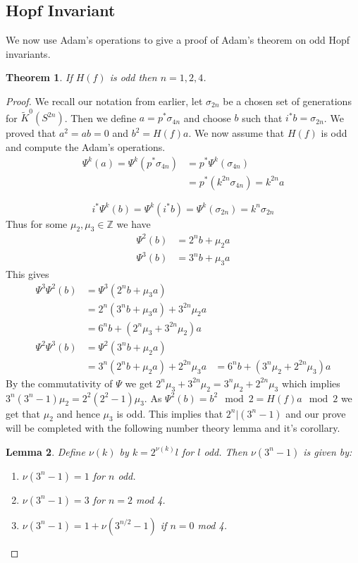 \documentclass[a4paper,10pt]{article}
\theoremstyle{plain}%
\newtheorem{thm}{Theorem}
\newtheorem{lem}[thm]{Lemma}
\theoremstyle{definition}
\theoremstyle{remark}
\newcommand{\ZZ}{\mathbb{Z}}
\newcommand{\KR}{\widetilde{K}}   %
\begin{document}
\subsection{Hopf Invariant}

We now use Adam's operations to give a proof of Adam's theorem on odd Hopf
invariants.

\begin{thm}
  If $H(f)$ is odd then $n=1,2,4$.
\end{thm}

\begin{proof}
  We recall our notation from earlier, let $\sigma_{2n}$ be a chosen set of generations for
  $\KR^0(S^{2n})$. Then we define $a=p^*\sigma_{4n}$ and choose $b$ such that
  $i^*b=\sigma_{2n}$. We proved that $a^2=a b=0$ and $b^2=H(f)a$. 
  We now assume  that $H(f)$ is odd and compute the Adam's operations.
  \begin{align*}
    \Psi^k(a)=\Psi^k(p^*\sigma_{4n})&=p^*\Psi^k(\sigma_{4n})\\
    &=p^*(k^{2n}\sigma_{4n})=k^{2n}a
  \end{align*}

$$ i^*\Psi^k(b)=\Psi^k(i^*b)=\Psi^k(\sigma_{2n})=k^n\sigma_{2n}$$
Thus for some $\mu_2,\mu_3\in\ZZ$ we have
\begin{align*}
  \Psi^2(b)&=2^nb+\mu_2a\\
  \Psi^3(b)&=3^nb+\mu_3a
\end{align*}
This gives
\begin{align*}
  \Psi^3\Psi^2(b)&=\Psi^3(2^nb+\mu_3a)\\
  &=2^n(3^nb+\mu_3a)+3^{2n}\mu_2a\\
  &=6^nb+(2^n\mu_3+3^{2n}\mu_2)a\\
  \Psi^2\Psi^3(b)&=\Psi^2(3^nb+\mu_2a)\\
  &=3^n(2^nb+\mu_2a)+2^{2n}\mu_3a
  &=6^nb+(3^n\mu_2+2^{2n}\mu_3)a
\end{align*}
By the commutativity of $\Psi$ we get
$2^n\mu_3+3^{2n}\mu_2=3^n\mu_2+2^{2n}\mu_3$ which implies
$3^n(3^n-1)\mu_2=2^2(2^2-1)\mu_3$. As $\Psi^2(b)=b^2 \mod 2 = H(f)a \mod 2$ we
get that $\mu_2$ and hence $\mu_3$ is odd. This implies that $2^n|(3^n-1)$ and
our prove will be completed with the following number theory lemma and it's corollary.

\begin{lem}
  Define $\nu(k)$ by $k=2^{\nu(k)}l$ for $l$ odd. Then $\nu(3^n-1)$ is given
  by:

  \begin{enumerate}
  \item $\nu(3^n-1)=1$ for $n$ odd.
  \item $\nu(3^n-1)=3$ for $n=2$ mod 4.
  \item $\nu(3^n-1)=1+\nu(3^{n/2}-1)$ if $n=0$ mod 4.
  \end{enumerate}
\end{lem}


\end{proof}
\end{document}
